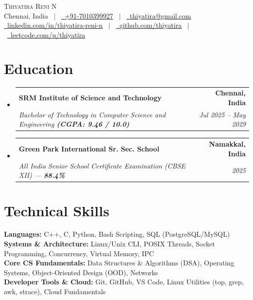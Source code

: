 \documentclass[letterpaper,10pt]{article}
\makeatletter
\newcommand{\resumeSubheading}[4]{
  \vspace{-1pt}\item
    \begin{tabular*}{1.0\textwidth}[t]{l@{\extracolsep{\fill}}r}
      \textbf{#1} & \textbf{\small #2} \\
      \textit{\small#3} & \textit{\small #4} \\
    \end{tabular*}\vspace{-4pt}
}
\newcommand{\resumeSubHeadingListStart}{\begin{itemize}[leftmargin=0.0in, label={}]}
\newcommand{\resumeSubHeadingListEnd}{\end{itemize}}
\makeatother
\begin{document}
\begin{center}
    {\Huge \scshape Thiyatira Reni N} \\ \vspace{4pt}
    \small Chennai, India \ $|$ \ 
    \href{tel:+917010399927}{\faPhone\ +91-7010399927} \ $|$ \ 
    \href{mailto:thiyatira@gmail.com}{\faEnvelope\ thiyatira@gmail.com} \\ \vspace{3pt}
    \href{https://www.linkedin.com/in/thiyatira-reni-n-19668b384/}{\faLinkedin\ \underline{linkedin.com/in/thiyatira-reni-n}} \ $|$ \ 
    \href{https://github.com/thiyatira}{\faGithub\ \underline{github.com/thiyatira}} \ $|$ \ 
    \href{https://leetcode.com/u/thiyatira/}{\faCode\ \underline{leetcode.com/u/thiyatira}}
\end{center}

\section{Education}
  \resumeSubHeadingListStart
    \resumeSubheading
      {SRM Institute of Science and Technology}{Chennai, India}
      {Bachelor of Technology in Computer Science and Engineering \textbf{(CGPA: 9.46 / 10.0)}}{Jul 2025 -- May 2029}
    \resumeSubheading
      {Green Park International Sr. Sec. School}{Namakkal, India}
      {All India Senior School Certificate Examination (CBSE XII) --- \textbf{88.4\%}}{2025}
  \resumeSubHeadingListEnd

\section{Technical Skills}
 \begin{itemize}[leftmargin=0.0in, label={}, itemsep=2pt]
    \small{\item{
     \textbf{Languages:}{ C++, C, Python, Bash Scripting, SQL (PostgreSQL/MySQL)} \\
     \textbf{Systems \& Architecture:}{ Linux/Unix CLI, POSIX Threads, Socket Programming, Concurrency, Virtual Memory, IPC} \\
     \textbf{Core CS Fundamentals:}{ Data Structures \& Algorithms (DSA), Operating Systems, Object-Oriented Design (OOD), Networks} \\
     \textbf{Developer Tools \& Cloud:}{ Git, GitHub, VS Code, Linux Utilities (top, grep, awk, strace), Cloud Fundamentals}
    }}
 \end{itemize}
\end{document}
